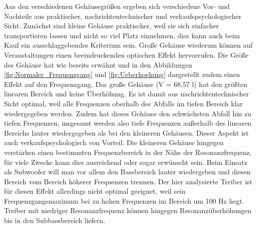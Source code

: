 Aus den verschiedenen Gehäusegrößen ergeben sich verschiedene Vor- und Nachteile aus praktischer, nachrichtentechnischer und verkaufspsychologischer Sicht.
Zunächst sind kleine Gehäuse praktischer, weil sie sich einfacher transportieren lassen und nicht so viel Platz einnehmen, dies kann auch beim Kauf ein ausschlaggebendes Kriterium sein.
Große Gehäuse wiederum können auf Veranstaltungen einen beeindruckenden optischen Effekt hervorrufen. 
Die Größe des Gehäuse hat wie bereits erwähnt und in den Abbildungen \ref{fig:Normaler_Frequenzgang} und \ref{fig:Ueberhoehung} dargestellt zudem einen Effekt auf den Frequenzgang. 
Das große Gehäuse (V = 68,57 l) hat den größten linearen Bereich und keine Überhöhung. 
Es ist damit aus nachrichtentechnischer Sicht optimal, weil alle Frequenzen oberhalb des Abfalls im tiefen Bereich klar wiedergegeben werden. 
Zudem hat dieses Gehäuse den schwächsten Abfall hin zu tiefen Frequenzen, insgesamt werden also tiefe Frequenzen außerhalb des linearen Bereichs lauter wiedergegeben als bei den kleineren Gehäusen.
Dieser Aspekt ist auch verkaufspsychologisch von Vorteil.
Die kleineren Gehäuse hingegen verstärken einen bestimmten Frequenzbereich in der Nähe der Resonanzfrequenz, für viele Zwecke kann dies ausreichend oder sogar erwünscht sein.
Beim Einsatz als Subwoofer will man vor allem den Bassbereich lauter wiedergeben und diesen Bereich vom Bereich höherer Frequenzen trennen.
Der hier analysierte Treiber ist für diesen Effekt allerdings nicht optimal geeignet, weil sein Frequenzgangsmaximum bei zu hohen Frequenzen im Bereich um 100 Hz liegt. 
Treiber mit niedriger Resonanzfrequenz können hingegen Resonanzüberhöhungen bis in den Subbassbereich liefern. 